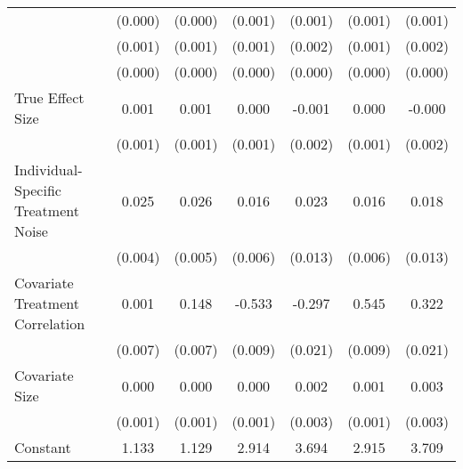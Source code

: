 \begin{table}[htbp]
\begin{tabular}{l*{6}{c}}
                    &     (0.000)         &     (0.000)         &     (0.001)         &     (0.001)         &     (0.001)         &     (0.001)         \\
                    &     (0.001)         &     (0.001)         &     (0.001)         &     (0.002)         &     (0.001)         &     (0.002)         \\
                    &     (0.000)         &     (0.000)         &     (0.000)         &     (0.000)         &     (0.000)         &     (0.000)         \\
True Effect Size    &       0.001         &       0.001\sym{*}  &       0.000         &      -0.001         &       0.000         &      -0.000         \\
                    &     (0.001)         &     (0.001)         &     (0.001)         &     (0.002)         &     (0.001)         &     (0.002)         \\
Individual-Specific Treatment Noise&       0.025\sym{***}&       0.026\sym{***}&       0.016\sym{**} &       0.023         &       0.016\sym{**} &       0.018         \\
                    &     (0.004)         &     (0.005)         &     (0.006)         &     (0.013)         &     (0.006)         &     (0.013)         \\
Covariate Treatment Correlation&       0.001         &       0.148\sym{***}&      -0.533\sym{***}&      -0.297\sym{***}&       0.545\sym{***}&       0.322\sym{***}\\
                    &     (0.007)         &     (0.007)         &     (0.009)         &     (0.021)         &     (0.009)         &     (0.021)         \\
Covariate Size      &       0.000         &       0.000         &       0.000         &       0.002         &       0.001         &       0.003         \\
                    &     (0.001)         &     (0.001)         &     (0.001)         &     (0.003)         &     (0.001)         &     (0.003)         \\
Constant            &       1.133\sym{***}&       1.129\sym{***}&       2.914\sym{***}&       3.694\sym{***}&       2.915\sym{***}&       3.709\sym{***}\\

\end{tabular}
\end{table}
